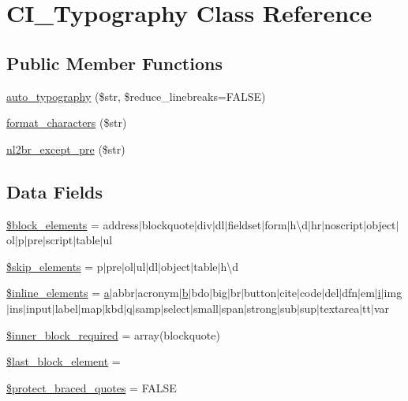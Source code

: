 \hypertarget{class_c_i___typography}{}\section{C\+I\+\_\+\+Typography Class Reference}
\label{class_c_i___typography}
\subsection*{Public Member Functions}
\begin{DoxyCompactItemize}
\item 
\mbox{\hyperlink{class_c_i___typography_a24c284b560f34d6c7fad07e36baaa024}{auto\+\_\+typography}} (\$str, \$reduce\+\_\+linebreaks=F\+A\+L\+SE)
\item 
\mbox{\hyperlink{class_c_i___typography_a45df135c8811c2b27085dbdfd05a1eed}{format\+\_\+characters}} (\$str)
\item 
\mbox{\hyperlink{class_c_i___typography_af9db9732eaa94a62b3a3ccc7f6bf860b}{nl2br\+\_\+except\+\_\+pre}} (\$str)
\end{DoxyCompactItemize}
\subsection*{Data Fields}
\begin{DoxyCompactItemize}
\item 
\mbox{\hyperlink{class_c_i___typography_ac99f5bbe8e02dc1147e9a4205dc161eb}{\$block\+\_\+elements}} = \textquotesingle{}address$\vert$blockquote$\vert$div$\vert$dl$\vert$fieldset$\vert$form$\vert$h\textbackslash{}d$\vert$hr$\vert$noscript$\vert$object$\vert$ol$\vert$p$\vert$pre$\vert$script$\vert$table$\vert$ul\textquotesingle{}
\item 
\mbox{\hyperlink{class_c_i___typography_a80c70a349bff88ad1ef94dea8753bc2e}{\$skip\+\_\+elements}} = \textquotesingle{}p$\vert$pre$\vert$ol$\vert$ul$\vert$dl$\vert$object$\vert$table$\vert$h\textbackslash{}d\textquotesingle{}
\item 
\mbox{\hyperlink{class_c_i___typography_a7ee5f0598125dc7e6b17a08aa6da384f}{\$inline\+\_\+elements}} = \textquotesingle{}\mbox{\hyperlink{interfacea}{a}}$\vert$abbr$\vert$acronym$\vert$\mbox{\hyperlink{interfaceb}{b}}$\vert$bdo$\vert$big$\vert$br$\vert$button$\vert$cite$\vert$code$\vert$del$\vert$dfn$\vert$em$\vert$\mbox{\hyperlink{interfacei}{i}}$\vert$img$\vert$ins$\vert$input$\vert$label$\vert$map$\vert$kbd$\vert$q$\vert$samp$\vert$select$\vert$small$\vert$span$\vert$strong$\vert$sub$\vert$sup$\vert$textarea$\vert$tt$\vert$var\textquotesingle{}
\item 
\mbox{\hyperlink{class_c_i___typography_a822eaf22f556c5c52bd766779d9ee22f}{\$inner\+\_\+block\+\_\+required}} = array(\textquotesingle{}blockquote\textquotesingle{})
\item 
\mbox{\hyperlink{class_c_i___typography_a8d5c4b7f2f7b74e118c682cf95688e22}{\$last\+\_\+block\+\_\+element}} = \textquotesingle{}\textquotesingle{}
\item 
\mbox{\hyperlink{class_c_i___typography_a6a74364571da23cc7187c864cde167ca}{\$protect\+\_\+braced\+\_\+quotes}} = F\+A\+L\+SE
\end{DoxyCompactItemize}
